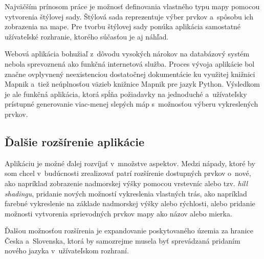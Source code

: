 Najväčším prínosom práce je možnosť definovania vlastného typu mapy pomocou vytvorenia štýlovej sady. Štýlová sada reprezentuje výber prvkov a~spôsobu ich zobrazenia na mape. Pre tvorbu štýlovej sady ponúka aplikácia samostatné užívateľské rozhranie, ktorého súčasťou je aj náhľad.

Webová aplikácia bohužiaľ z~dôvodu vysokých nárokov na databázový systém nebola sprevoznená ako funkčná internetová služba. Proces vývoja aplikácie bol značne ovplyvnený neexistenciou dostatočnej dokumentácie ku využitej knižnici Mapnik a~tiež neúplnosťou väzieb knižnice Mapnik pre jazyk Python. Výsledkom je ale funkčná aplikácia, ktorá spĺňa požiadavky na jednoduché a~užívateľsky prístupné generovanie viac-menej slepých máp s~možnosťou výberu vykreslených prvkov.

\subsection*{Ďalšie rozšírenie aplikácie}
Aplikáciu je možné ďalej rozvíjať v~množstve aspektov. Medzi nápady, ktoré by som chcel v~budúcnosti zrealizovať patrí rozšírenie dostupných prvkov o~nové, ako napríklad zobrazenie nadmorskej výšky pomocou vrstevníc alebo tzv. {\it hill shadingu}, pridanie nových možností vykreslenia vlastných trás, ako napríklad farebné vykreslenie na základe nadmorskej výšky alebo rýchlosti, alebo pridanie možnosti vytvorenia sprievodných prvkov mapy ako názov alebo mierka.

Ďalšou možnosťou rozšírenia je expandovanie poskytovaného územia za hranice Česka a~Slovenska, ktorá by samozrejme musela byť sprevádzaná pridaním nového jazyka v~užívateľskom rozhraní.

